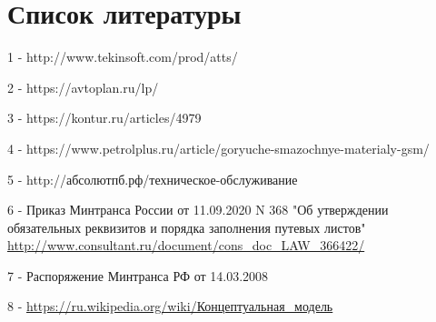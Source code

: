 \documentclass[./nirs.tex]{subfiles}
\begin{document}
\section*{Список литературы}
	1 - http://www.tekinsoft.com/prod/atts/

	2 - https://avtoplan.ru/lp/

	3 - https://kontur.ru/articles/4979

	4 - https://www.petrolplus.ru/article/goryuche-smazochnye-materialy-gsm/

	5 - http://абсолютпб.рф/техническое-обслуживание

	6 - Приказ Минтранса России от 11.09.2020 N 368 "Об утверждении обязательных
	реквизитов и порядка заполнения путевых листов"\\
	\url{http://www.consultant.ru/document/cons_doc_LAW_366422/}

	7 - Распоряжение Минтранса РФ от 14.03.2008 

	8 - \url{https://ru.wikipedia.org/wiki/Концептуальная\_модель}
\end{document}
